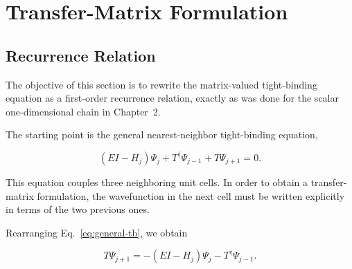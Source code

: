 
\begin{center}
\end{center}

\section{Transfer-Matrix Formulation}

\subsection{Recurrence Relation}
The objective of this section is to rewrite the matrix-valued
tight-binding equation as a first-order recurrence relation, exactly as
was done for the scalar one-dimensional chain in Chapter~2.

The starting point is the general nearest-neighbor tight-binding
equation,

\begin{equation}
	(EI-H_j)\Psi_j
	+
	T^\dagger\Psi_{j-1}
	+
	T\Psi_{j+1}
	=
	0.
	\label{eq:general-tb}
\end{equation}

This equation couples three neighboring unit cells. In order to obtain a
transfer-matrix formulation, the wavefunction in the next cell must be
written explicitly in terms of the two previous ones.

Rearranging Eq.~\eqref{eq:general-tb}, we obtain

\begin{equation}
	T\Psi_{j+1}
	=
	-
	(EI-H_j)\Psi_j
	-
	T^\dagger\Psi_{j-1}.
	\label{eq:isolate-forward}
\end{equation}

